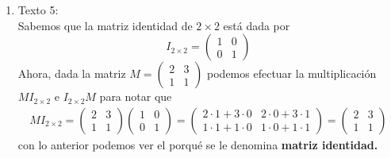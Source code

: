 \documentclass[12pt]{article}
\begin{document}
\begin{enumerate}
    \item[] Texto 5:\\
    Sabemos que la matriz identidad de $2\times 2$ está dada por
    \begin{equation}
        I_{2\times2}=\left(\begin{array}{cc}
             1& 0 \\
             0& 1
        \end{array}\right)
    \end{equation}
    Ahora, dada la matriz $M=\left(\begin{array}{cc}
             2& 3 \\
             1& 1
        \end{array}\right)$
    podemos efectuar la multiplicación $MI_{2\times2}$ e $I_{2\times2}M$ para notar que
    \begin{align*}
        MI_{2\times2}=\left(\begin{array}{cc}
             2& 3 \\
             1& 1
        \end{array}\right)\left(\begin{array}{cc}
             1& 0 \\
             0& 1
        \end{array}\right)=\left(\begin{array}{cc}
             2\cdot 1+3\cdot 0&2\cdot 0+3\cdot 1   \\
             1\cdot 1+1\cdot 0& 1\cdot 0+1\cdot 1
        \end{array}\right)=\left(\begin{array}{cc}
             2& 3 \\
             1& 1
        \end{array}\right)
    \end{align*}
    con lo anterior podemos ver el porqué se le denomina \textbf{matriz identidad.} 
\end{enumerate}
\end{document}
